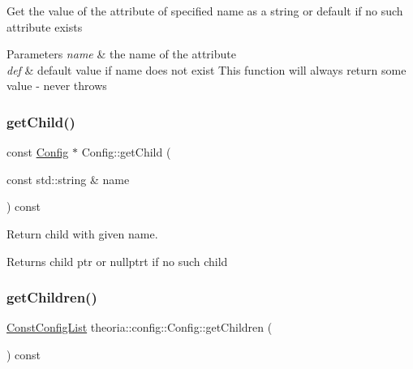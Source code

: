 Get the value of the attribute of specified name as a string or default if no such attribute exists 
\begin{DoxyParams}{Parameters}
{\em name} & the name of the attribute \\
\hline
{\em def} & default value if name does not exist This function will always return some value -\/ never throws \\
\hline
\end{DoxyParams}
\mbox{\label{classtheoria_1_1config_1_1Config_af8e4621be24f1860b1fed707628db7e9}} 
\subsubsection{\texorpdfstring{get\+Child()}{getChild()}}
{\footnotesize\ttfamily const \hyperlink{classtheoria_1_1config_1_1Config}{Config} $\ast$ Config\+::get\+Child (\begin{DoxyParamCaption}\item[{const std\+::string \&}]{name }\end{DoxyParamCaption}) const}

Return child with given name. \begin{DoxyReturn}{Returns}
child ptr or nullptrt if no such child 
\end{DoxyReturn}
\mbox{\label{classtheoria_1_1config_1_1Config_ab258c41faac01f6dda0ff0c86adc9903}} 
\subsubsection{\texorpdfstring{get\+Children()}{getChildren()}\hspace{0.1cm}{\footnotesize\ttfamily [1/2]}}
{\footnotesize\ttfamily \hyperlink{classtheoria_1_1config_1_1Config_a61230728ffa4d92667a536c8c0f0ca30}{Const\+Config\+List} theoria\+::config\+::\+Config\+::get\+Children (\begin{DoxyParamCaption}{ }\end{DoxyParamCaption}) const\hspace{0.3cm}{\ttfamily [inline]}}

